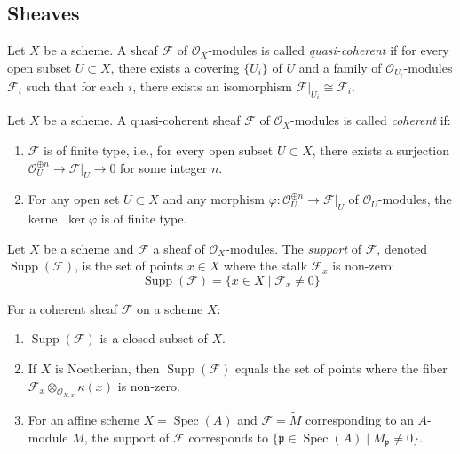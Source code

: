\documentclass[12pt]{article}
\begin{document}
\subsection{Sheaves}

\begin{definition}
    Let $X$ be a scheme. A sheaf $\mathcal{F}$ of $\mathcal{O}_X$-modules is called \textit{quasi-coherent} if for every open subset $U \subset X$, there exists a covering $\{U_i\}$ of $U$ and a family of $\mathcal{O}_{U_i}$-modules $\mathcal{F}_i$ such that for each $i$, there exists an isomorphism $\mathcal{F}|_{U_i} \cong \mathcal{F}_i$.
\end{definition}

\begin{definition}
    Let $X$ be a scheme. A quasi-coherent sheaf $\mathcal{F}$ of $\mathcal{O}_X$-modules is called \textit{coherent} if:
    \begin{enumerate}
        \item $\mathcal{F}$ is of finite type, i.e., for every open subset $U \subset X$, there exists a surjection $\mathcal{O}_U^{\oplus n} \to \mathcal{F}|_U \to 0$ for some integer $n$.
        \item For any open set $U \subset X$ and any morphism $\varphi: \mathcal{O}_U^{\oplus n} \to \mathcal{F}|_U$ of $\mathcal{O}_U$-modules, the kernel $\ker \varphi$ is of finite type.
    \end{enumerate}
\end{definition}

\begin{definition}
    Let $X$ be a scheme and $\mathcal{F}$ a sheaf of $\mathcal{O}_X$-modules. The \textit{support} of $\mathcal{F}$, denoted $\operatorname{Supp}(\mathcal{F})$, is the set of points $x \in X$ where the stalk $\mathcal{F}_x$ is non-zero:
    \[
        \operatorname{Supp}(\mathcal{F}) = \{x \in X \mid \mathcal{F}_x \neq 0\}
    \]
\end{definition}

\begin{proposition}
    For a coherent sheaf $\mathcal{F}$ on a scheme $X$:
    \begin{enumerate}
        \item $\operatorname{Supp}(\mathcal{F})$ is a closed subset of $X$.
        \item If $X$ is Noetherian, then $\operatorname{Supp}(\mathcal{F})$ equals the set of points where the fiber $\mathcal{F}_x \otimes_{\mathcal{O}_{X,x}} \kappa(x)$ is non-zero.
        \item For an affine scheme $X = \operatorname{Spec}(A)$ and $\mathcal{F} = \widetilde{M}$ corresponding to an $A$-module $M$, the support of $\mathcal{F}$ corresponds to $\{\mathfrak{p} \in \operatorname{Spec}(A) \mid M_{\mathfrak{p}} \neq 0\}$.
    \end{enumerate}
\end{proposition}
\end{document}
